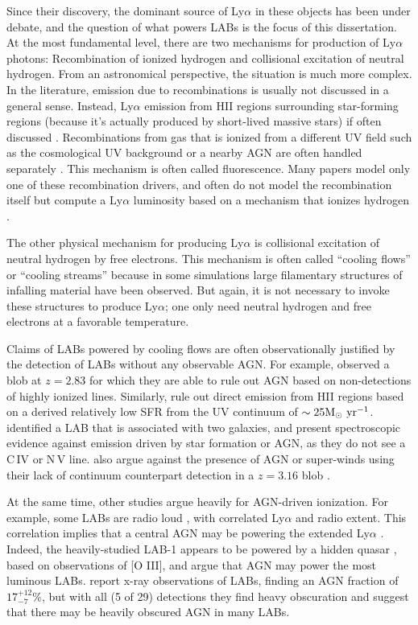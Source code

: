 Since their discovery, the dominant source of Ly$\alpha$ in these objects has been under debate, and the question of what powers LABs is the focus of this dissertation.
At the most fundamental level, there are two mechanisms for production of Ly$\alpha$ photons: Recombination of ionized hydrogen and collisional excitation of neutral hydrogen.
From an astronomical perspective, the situation is much more complex.
In the literature, emission due to recombinations is usually not discussed in a general sense.
Instead, Ly$\alpha$ emission from HII regions surrounding star-forming regions (because it's actually produced by short-lived massive stars) if often discussed \citep[e.g.][]{Geach2016}.
Recombinations from gas that is ionized from a different UV field such as the cosmological UV background or a nearby AGN are often handled separately \citep{Kollmeier2010,Gronke2017}.
This mechanism is often called fluorescence.
Many papers model only one of these recombination drivers, and often do not model the recombination itself but compute a Ly$\alpha$ luminosity based on a mechanism that ionizes hydrogen \citep[e.g.][]{Cen2013}.

The other physical mechanism for producing Ly$\alpha$ is collisional excitation of neutral hydrogen by free electrons.
This mechanism is often called ``cooling flows'' or ``cooling streams'' because in some simulations large filamentary structures of infalling material have been observed.
But again, it is not necessary to invoke these structures to produce Ly$\alpha$; one only need neutral hydrogen and free electrons at a favorable temperature.

Claims of LABs powered by cooling flows are often observationally justified by the detection of LABs without any observable AGN.
For example, \citet{Smith2007} observed a blob at $z=2.83$ for which they are able to rule out AGN based on non-detections of highly ionized lines.
Similarly, \citet{Smith2007} rule out direct emission from HII regions based on a derived relatively low SFR from the UV continuum of  $\sim 25 \rm{M}_{\odot}\ \rm{yr}^{-1}$.
 \citet{Scarlata2009} identified a LAB that is associated with two galaxies, and present spectroscopic evidence against emission driven by star formation or AGN, as they do not see a C\,\textsc{IV} or N\,\textsc{V} line.
\citet{Nilsson2006} also argue against the presence of AGN or super-winds using their lack of continuum counterpart detection in a $z=3.16$ blob \citep[though this is debated, see e.g.][]{Prescott2015}.

At the same time, other studies argue heavily for AGN-driven ionization.
For example, some LABs are radio loud \citep{Miley2008}, with correlated Ly$\alpha$ and radio extent.
This correlation implies that a central AGN may be powering the extended Ly$\alpha$ \citep{vanOjik1997}.
Indeed, the heavily-studied LAB-1 appears to be powered by a hidden quasar \citep{Overzier2013}, based on observations of \textsc{[O III]}, and argue that AGN may power the most luminous LABs.
\citet{Geach2009} report x-ray observations of LABs, finding an AGN fraction of $17^{+12}_{-7}\%$, but with all (5 of 29) detections they find heavy obscuration and suggest that there may be heavily obscured AGN in many LABs.


